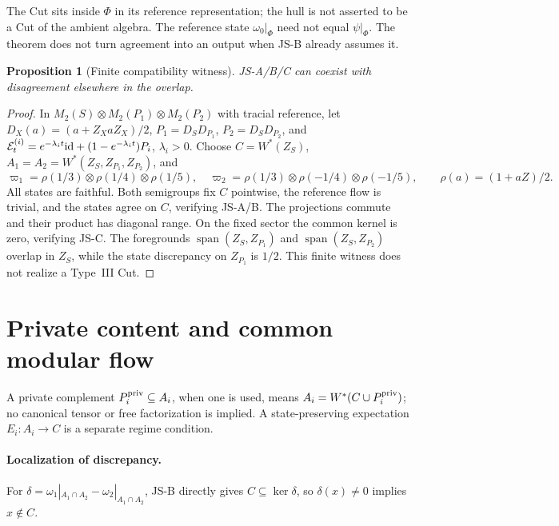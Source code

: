 \documentclass[12pt]{article}
\newtheorem{proposition}[theorem]{Proposition}
\theoremstyle{definition}
\theoremstyle{remark}
\begin{document}
The Cut sits inside \(\Phi\) in its reference representation; the hull
is not asserted to be a Cut of the ambient algebra. The reference
state \(\omega_0|_\Phi\) need not equal \(\psi|_\Phi\). The theorem
does not turn agreement into an output when JS-B already assumes it.

\begin{proposition}[Finite compatibility witness]\label{prop:fdwitness}
JS-A/B/C can coexist with disagreement elsewhere in the overlap.
\end{proposition}
\begin{proof}
In \(M_2(S)\otimes M_2(P_1)\otimes M_2(P_2)\) with tracial reference,
let \(D_X(a)=(a+Z_XaZ_X)/2\), \(P_1=D_SD_{P_1}\),
\(P_2=D_SD_{P_2}\), and
\(\mathcal E_t^{(i)}=e^{-\lambda_i t}{\rm id}
 +(1-e^{-\lambda_i t})P_i\), \(\lambda_i>0\).
Choose \(C=W^*(Z_S)\), \(A_1=A_2=W^*(Z_S,Z_{P_1},Z_{P_2})\), and
\[
 \varpi_1=\rho(1/3)\otimes\rho(1/4)\otimes\rho(1/5),\quad
 \varpi_2=\rho(1/3)\otimes\rho(-1/4)\otimes\rho(-1/5),
 \qquad \rho(a)=(1+aZ)/2 .
\]
All states are faithful. Both semigroups fix \(C\) pointwise, the
reference flow is trivial, and the states agree on \(C\), verifying
JS-A/B. The projections commute and their product has diagonal range.
On the fixed sector the common kernel is zero, verifying JS-C.
The foregrounds \(\operatorname{span}(Z_S,Z_{P_1})\) and
\(\operatorname{span}(Z_S,Z_{P_2})\) overlap in \(Z_S\), while the
state discrepancy on \(Z_{P_1}\) is \(1/2\). This finite witness does
not realize a Type~III Cut.
\end{proof}

\section{Private content and common modular flow}\label{sec:cp}

A private complement \(P_i^{\rm priv}\subseteq A_i\), when one is used,
means \(A_i=W^*(C\cup P_i^{\rm priv})\); no canonical tensor or free
factorization is implied. A state-preserving expectation
\(E_i:A_i\to C\) is a separate regime condition.

\paragraph{Localization of discrepancy.}\label{prop:cpdiscrepancy}
For $\delta=\omega_1|_{A_1\cap A_2}-\omega_2|_{A_1\cap A_2}$,
JS-B directly gives $C\subseteq\ker\delta$, so $\delta(x)\ne0$
implies $x\notin C$.
\end{document}
